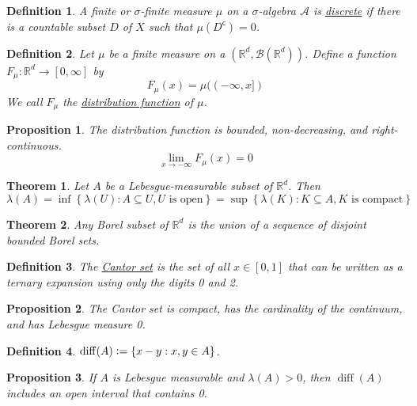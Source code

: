 \documentclass[12pt]{article}    %
\newtheorem{definition}{Definition}[subsection]
\newtheorem{proposition}{Proposition}[subsection]
\newtheorem{theorem}{Theorem}[subsection]
\begin{document}
\begin{definition}
	A finite or $\sigma$-finite measure $\mu$ on a $\sigma$-algebra $\mathcal{A}$ is \underline{discrete} if there is a countable subset $D$ of $X$ such that $\mu(D^\mathsf{c}) = 0$.
\end{definition}

\begin{definition}
	Let $\mu$ be a finite measure on a $(\mathbb{R}^d, \mathcal{B}(\mathbb{R}^d))$. Define a function $F_\mu: \mathbb{R}^d \to [0, \infty]$ by
	$$F_\mu(x) = \mu((-\infty, x])$$
	We call $F_\mu$ the \underline{distribution function} of $\mu$.
\end{definition}
\begin{proposition}
	The distribution function is bounded, non-decreasing, and right-continuous.
	$$ \lim_{x \to -\infty} F_\mu(x) = 0$$
\end{proposition}

\begin{theorem}
	Let $A$ be a Lebesgue-measurable subset of $\mathbb{R}^d$. Then
	$$\lambda(A) = \inf\left\{\lambda(U): A \subseteq U, U \text{ is open}\right\}= \sup\left\{\lambda(K): K \subseteq A, K \text{ is compact}\right\}$$
\end{theorem}

\begin{theorem}
	Any Borel subset of $\mathbb{R}^d$ is the union of a sequence of disjoint bounded Borel sets.
\end{theorem}

\begin{definition}
	The \underline{Cantor set} is the set of all $x \in [0, 1]$ that can be written as a ternary expansion using only the digits 0 and 2.
\end{definition}
\begin{proposition}
	The Cantor set is compact, has the cardinality of the continuum, and has Lebesgue measure 0.
\end{proposition}
\begin{definition}
	$\operatorname{diff}(A)\vcentcolon= \{x - y: x, y \in A\}$.
\end{definition}
\begin{proposition}
	If $A$ is Lebesgue measurable and $\lambda (A)>0$, then $\operatorname{diff}(A)$ includes an open interval that contains 0.
\end{proposition}
\end{document}
